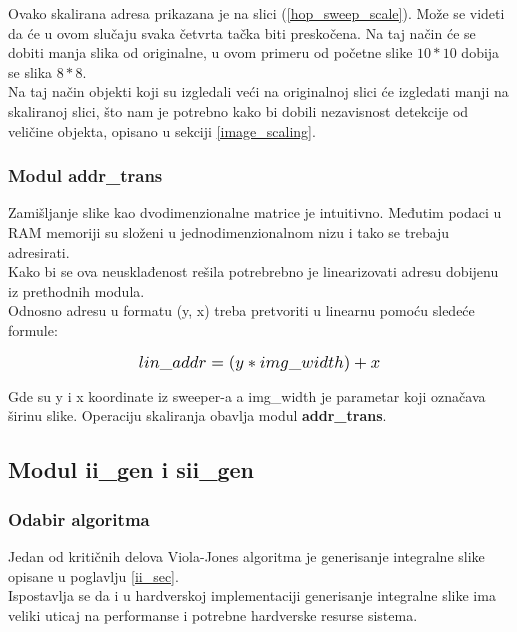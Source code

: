 Ovako skalirana adresa prikazana je na slici (\ref{hop_sweep_scale}).
Može se videti da će u ovom slučaju svaka četvrta tačka biti preskočena.
Na taj način će se dobiti manja slika od originalne, u ovom primeru od početne
slike $10*10$ dobija se slika $8*8$. \\
Na taj način objekti koji su izgledali veći na originalnoj slici će izgledati
manji na skaliranoj slici, što nam je potrebno kako bi dobili nezavisnost
detekcije od veličine objekta, opisano u sekciji \ref{image_scaling}.

\subsubsection{Modul addr\_trans}\label{addr_trans_sec}

Zamišljanje slike kao dvodimenzionalne matrice je intuitivno.
Međutim podaci u RAM memoriji su složeni u jednodimenzionalnom nizu i tako se
trebaju adresirati. \\
Kako bi se ova neusklađenost rešila potrebrebno je linearizovati adresu dobijenu
iz prethodnih modula. \\
Odnosno adresu u formatu (y, x) treba pretvoriti u linearnu pomoću sledeće formule:

\begin{equation}
  \Scale[1.2]{lin\_addr = (y * img\_width) + x}
  \label{IntegralImage_eq2}
\end{equation}

\noindent
Gde su y i x koordinate iz sweeper-a a img\_width je parametar koji označava
širinu slike.
Operaciju skaliranja obavlja modul \textbf{addr\_trans}. \\

\subsection{Modul ii\_gen i sii\_gen} \label{ii_sii_gen_sec}

\subsubsection{Odabir algoritma}\label{ii_alg_sel_sec}

Jedan od kritičnih delova Viola-Jones algoritma je generisanje integralne slike
opisane u poglavlju \ref{ii_sec}. \\
Ispostavlja se da i u hardverskoj implementaciji generisanje
integralne slike ima veliki uticaj na performanse i potrebne hardverske resurse sistema. \\

